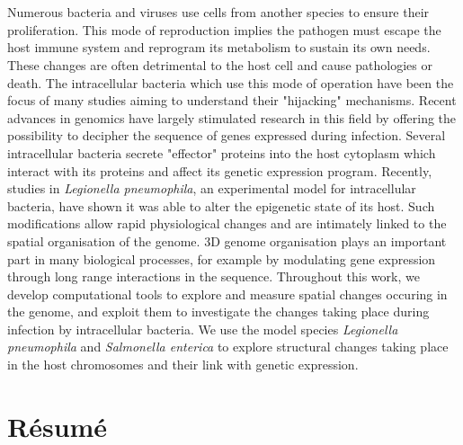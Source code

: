 %
\chapter*{\abstractname}
\label{sec:abstract}
\vspace*{-10mm}

Numerous bacteria and viruses use cells from another species to ensure their proliferation. This mode of reproduction implies the pathogen must escape the host immune system and reprogram its metabolism to sustain its own needs. These changes are often detrimental to the host cell and cause pathologies or death. The intracellular bacteria which use this mode of operation have been the focus of many studies aiming to understand their "hijacking" mechanisms. Recent advances in genomics have largely stimulated research in this field by offering the possibility to decipher the sequence of genes expressed during infection. Several intracellular bacteria secrete "effector" proteins into the host cytoplasm which interact with its proteins and affect its genetic expression program. Recently, studies in \textit{Legionella pneumophila}, an experimental model for intracellular bacteria, have shown it was able to alter the epigenetic state of its host. Such modifications allow rapid physiological changes and are intimately linked to the spatial organisation of the genome. 3D genome organisation plays an important part in many biological processes, for example by modulating gene expression through long range interactions in the sequence. Throughout this work, we develop computational tools to explore and measure spatial changes occuring in the genome, and exploit them to investigate the changes taking place during infection by intracellular bacteria. We use the model species \textit{Legionella pneumophila} and \textit{Salmonella enterica} to explore structural changes taking place in the host chromosomes and their link with genetic expression.

\vspace*{20mm}

\chapter*{Résumé}
\label{sec:abstract-diff}

